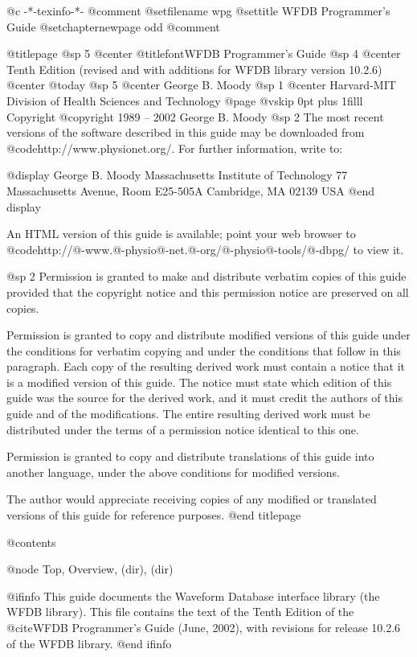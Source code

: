 	@c -*-texinfo-*-
@comment %
@setfilename wpg
@settitle WFDB Programmer's Guide
@setchapternewpage odd
@comment %

@titlepage
@sp 5
@center @titlefont{WFDB Programmer's Guide}
@sp 4
@center Tenth Edition (revised and with additions for WFDB library version 10.2.6)
@center @today
@sp 5
@center George B. Moody
@sp 1
@center Harvard-MIT Division of Health Sciences and Technology
@page
@vskip 0pt plus 1filll
Copyright @copyright{} 1989 -- 2002 George B. Moody
@sp 2
The most recent versions of the software described in this guide may be
downloaded from @code{http://www.physionet.org/}.  For further
information, write to:

@display
George B. Moody
Massachusetts Institute of Technology
77 Massachusetts Avenue, Room E25-505A
Cambridge, MA 02139
USA
@end display

An HTML version of this guide is available;  point your web browser to
@code{http://@-www.@-physio@-net.@-org/@-physio@-tools/@-dbpg/} to view it.

@sp 2
Permission is granted to make and distribute verbatim copies of this
guide provided that the copyright notice and this permission notice are
preserved on all copies.

Permission is granted to copy and distribute modified versions of this
guide under the conditions for verbatim copying and under the conditions
that follow in this paragraph.  Each copy of the resulting derived work
must contain a notice that it is a modified version of this guide.  The
notice must state which edition of this guide was the source for the derived
work, and it must credit the authors of this guide and of the
modifications.  The entire resulting derived work must be distributed
under the terms of a permission notice identical to this one.

Permission is granted to copy and distribute translations of this guide
into another language, under the above conditions for modified versions.

The author would appreciate receiving copies of any modified or
translated versions of this guide for reference purposes.
@end titlepage

@contents

@node Top, Overview, (dir), (dir)

@ifinfo
This guide documents the Waveform Database interface library (the WFDB
library).  This file contains the text of the Tenth Edition of
the @cite{WFDB Programmer's Guide} (June, 2002), with
revisions for release 10.2.6 of the WFDB library.
@end ifinfo

